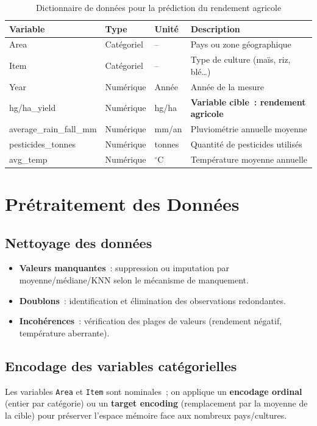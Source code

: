 \begin{table}[H]
\centering
\caption{Dictionnaire de données pour la prédiction du rendement agricole}
\label{tab:dictionnaire-donnees}
\renewcommand{\arraystretch}{1.4}
\begin{tabularx}{\textwidth}{|>{\ttfamily}p{3.5cm}|p{2.2cm}|p{2cm}|X|}
\hline
\rowcolor{maingreen!15}\textbf{Variable} & \textbf{Type} & \textbf{Unité} & \textbf{Description} \\
\hline
Area & Catégoriel & -- & Pays ou zone géographique \\
\hline
Item & Catégoriel & -- & Type de culture (maïs, riz, blé\ldots) \\
\hline
Year & Numérique & Année & Année de la mesure \\
\hline
hg/ha\_yield & Numérique & hg/ha & \textbf{Variable cible~: rendement agricole} \\
\hline
average\_rain\_fall\_mm & Numérique & mm/an & Pluviométrie annuelle moyenne \\
\hline
pesticides\_tonnes & Numérique & tonnes & Quantité de pesticides utilisés \\
\hline
avg\_temp & Numérique & $^\circ$C & Température moyenne annuelle \\
\hline
\end{tabularx}
\end{table}

\section{Prétraitement des Données}

\subsection{Nettoyage des données}
\begin{itemize}[leftmargin=1.5cm, itemsep=3pt]
  \item \textbf{Valeurs manquantes}~: suppression ou imputation par moyenne/médiane/KNN selon le mécanisme de manquement.
  \item \textbf{Doublons}~: identification et élimination des observations redondantes.
  \item \textbf{Incohérences}~: vérification des plages de valeurs (rendement négatif, température aberrante).
\end{itemize}

\subsection{Encodage des variables catégorielles}
Les variables \texttt{Area} et \texttt{Item} sont nominales~; on applique un \textbf{encodage ordinal} (entier par catégorie) ou un \textbf{target encoding} (remplacement par la moyenne de la cible) pour préserver l'espace mémoire face aux nombreux pays/cultures.

